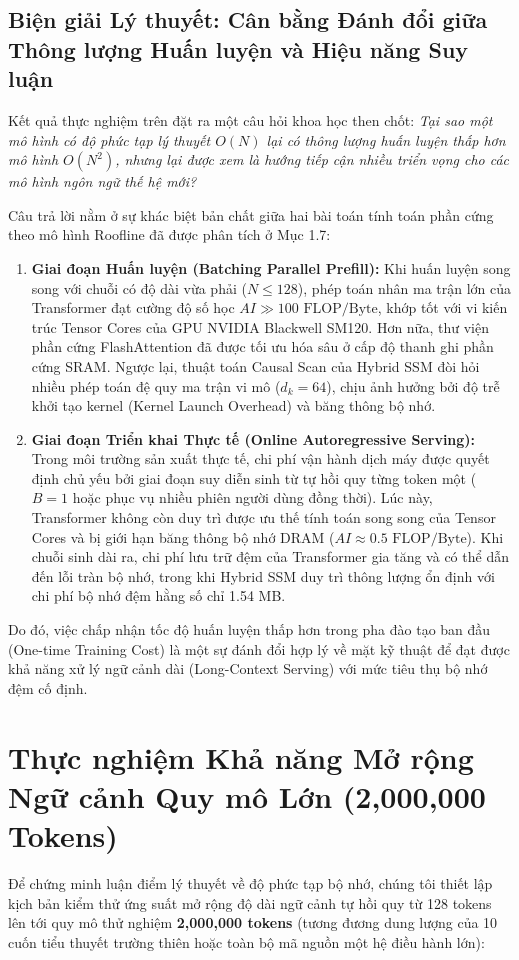 \documentclass{uetgraduation}
\begin{document}
\subsection{Biện giải Lý thuyết: Cân bằng Đánh đổi giữa Thông lượng Huấn luyện và Hiệu năng Suy luận}
Kết quả thực nghiệm trên đặt ra một câu hỏi khoa học then chốt: \textit{Tại sao một mô hình có độ phức tạp lý thuyết $O(N)$ lại có thông lượng huấn luyện thấp hơn mô hình $O(N^2)$, nhưng lại được xem là hướng tiếp cận nhiều triển vọng cho các mô hình ngôn ngữ thế hệ mới?}

Câu trả lời nằm ở sự khác biệt bản chất giữa hai bài toán tính toán phần cứng theo mô hình Roofline đã được phân tích ở Mục 1.7:
\begin{enumerate}
    \item \textbf{Giai đoạn Huấn luyện (Batching Parallel Prefill):} Khi huấn luyện song song với chuỗi có độ dài vừa phải ($N \le 128$), phép toán nhân ma trận lớn của Transformer đạt cường độ số học $AI \gg 100 \text{ FLOP/Byte}$, khớp tốt với vi kiến trúc Tensor Cores của GPU NVIDIA Blackwell SM120. Hơn nữa, thư viện phần cứng FlashAttention đã được tối ưu hóa sâu ở cấp độ thanh ghi phần cứng SRAM. Ngược lại, thuật toán Causal Scan của Hybrid SSM đòi hỏi nhiều phép toán đệ quy ma trận vi mô ($d_k=64$), chịu ảnh hưởng bởi độ trễ khởi tạo kernel (Kernel Launch Overhead) và băng thông bộ nhớ.
    \item \textbf{Giai đoạn Triển khai Thực tế (Online Autoregressive Serving):} Trong môi trường sản xuất thực tế, chi phí vận hành dịch máy được quyết định chủ yếu bởi giai đoạn suy diễn sinh từ tự hồi quy từng token một ($B=1$ hoặc phục vụ nhiều phiên người dùng đồng thời). Lúc này, Transformer không còn duy trì được ưu thế tính toán song song của Tensor Cores và bị giới hạn băng thông bộ nhớ DRAM ($AI \approx 0.5 \text{ FLOP/Byte}$). Khi chuỗi sinh dài ra, chi phí lưu trữ đệm của Transformer gia tăng và có thể dẫn đến lỗi tràn bộ nhớ, trong khi Hybrid SSM duy trì thông lượng ổn định với chi phí bộ nhớ đệm hằng số chỉ 1.54 MB.
\end{enumerate}
Do đó, việc chấp nhận tốc độ huấn luyện thấp hơn trong pha đào tạo ban đầu (One-time Training Cost) là một sự đánh đổi hợp lý về mặt kỹ thuật để đạt được khả năng xử lý ngữ cảnh dài (Long-Context Serving) với mức tiêu thụ bộ nhớ đệm cố định.

\section{Thực nghiệm Khả năng Mở rộng Ngữ cảnh Quy mô Lớn (2,000,000 Tokens)}
Để chứng minh luận điểm lý thuyết về độ phức tạp bộ nhớ, chúng tôi thiết lập kịch bản kiểm thử ứng suất mở rộng độ dài ngữ cảnh tự hồi quy từ 128 tokens lên tới quy mô thử nghiệm \textbf{2,000,000 tokens} (tương đương dung lượng của 10 cuốn tiểu thuyết trường thiên hoặc toàn bộ mã nguồn một hệ điều hành lớn):
\end{document}
